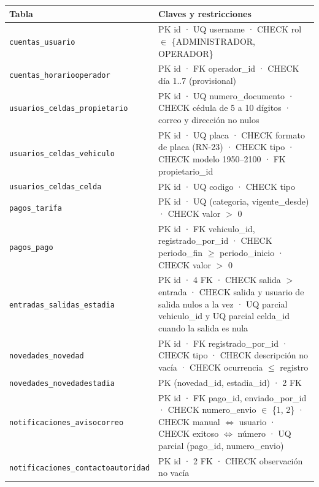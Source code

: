\begin{longtable}{>{\raggedright\arraybackslash}p{4.4cm}>{\raggedright\arraybackslash}p{10cm}}
\toprule
\textbf{Tabla} & \textbf{Claves y restricciones}\\
\midrule\endhead
\texttt{cuentas\_usuario} & PK id · UQ username · CHECK rol $\in$ \{ADMINISTRADOR, OPERADOR\}\\
\texttt{cuentas\_horariooperador} & PK id · FK operador\_id · CHECK día 1..7 (provisional)\\
\texttt{usuarios\_celdas\_propietario} & PK id · UQ numero\_documento · CHECK cédula de 5 a 10 dígitos · correo y dirección no nulos\\
\texttt{usuarios\_celdas\_vehiculo} & PK id · UQ placa · CHECK formato de placa (RN-23) · CHECK tipo · CHECK modelo 1950--2100 · FK propietario\_id\\
\texttt{usuarios\_celdas\_celda} & PK id · UQ codigo · CHECK tipo\\
\texttt{pagos\_tarifa} & PK id · UQ (categoria, vigente\_desde) · CHECK valor $>$ 0\\
\texttt{pagos\_pago} & PK id · FK vehiculo\_id, registrado\_por\_id · CHECK periodo\_fin $\geq$ periodo\_inicio · CHECK valor $>$ 0\\
\texttt{entradas\_salidas\_estadia} & PK id · 4 FK · CHECK salida $>$ entrada · CHECK salida y usuario de salida nulos a la vez · UQ parcial vehiculo\_id y UQ parcial celda\_id cuando la salida es nula\\
\texttt{novedades\_novedad} & PK id · FK registrado\_por\_id · CHECK tipo · CHECK descripción no vacía · CHECK ocurrencia $\leq$ registro\\
\texttt{novedades\_novedadestadia} & PK (novedad\_id, estadia\_id) · 2 FK\\
\texttt{notificaciones\_avisocorreo} & PK id · FK pago\_id, enviado\_por\_id · CHECK numero\_envio $\in$ \{1, 2\} · CHECK manual $\Leftrightarrow$ usuario · CHECK exitoso $\Leftrightarrow$ número · UQ parcial (pago\_id, numero\_envio)\\
\texttt{notificaciones\_contactoautoridad} & PK id · 2 FK · CHECK observación no vacía\\
\bottomrule
\end{longtable}

